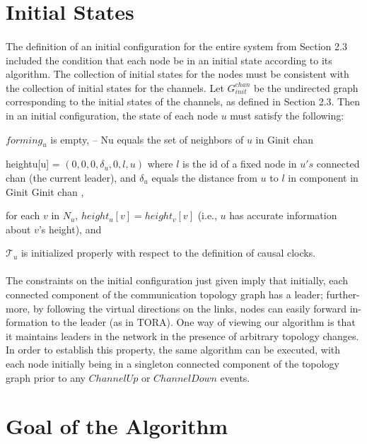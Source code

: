 \section{Initial States}
\paragraph{}The definition of an initial configuration for the entire system from Section 2.3 included the condition that each node be in an initial state according to its algorithm. The collection of initial states for the nodes must be consistent with the collection of initial states for the channels. Let $G_{init} ^{chan}$ be the undirected graph corresponding to the initial states of the channels, as defined in Section 2.3. Then in an initial configuration, the state of each node $u$ must satisfy the following:
\begin{list}{--}{spacing}
	\item $forming_u$ is empty, – Nu equals the set of neighbors of $u$ in Ginit chan
	\item heightu[u] = $(0, 0, 0, \delta _u , 0, l, u)$ where $l$ is the id of a fixed node in $u's$ connected chan (the current leader), and $\delta _u$ equals the distance from $u$ to $l$ in component in Ginit Ginit chan ,
	\item for each $v$ in $N_u$, $height_u[v] = height_v[v]$ (i.e., $u$ has accurate information about $v$’s height), and
	\item $\mathcal{T} _u$ is initialized properly with respect to the definition of causal clocks.
\end{list}
\paragraph{}The constraints on the initial configuration just given imply that initially, each connected component of the communication topology graph has a leader; further- more, by following the virtual directions on the links, nodes can easily forward in- formation to the leader (as in TORA). One way of viewing our algorithm is that it maintains leaders in the network in the presence of arbitrary topology changes. In order to establish this property, the same algorithm can be executed, with each node initially being in a singleton connected component of the topology graph prior to any $ChannelUp$ or $ChannelDown$ events.
\section{Goal of the Algorithm}
